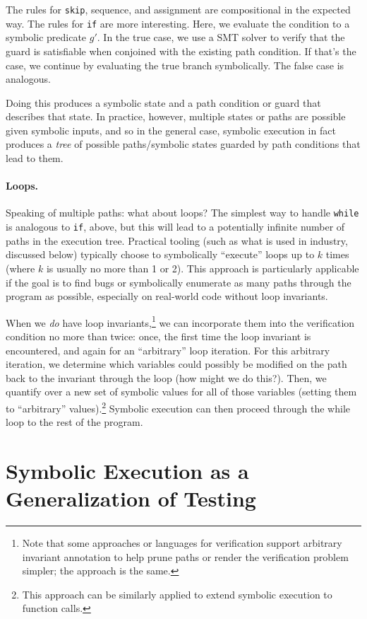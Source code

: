 \documentclass[11pt]{article}
\begin{document}
The rules for \texttt{skip}, sequence, and assignment are compositional in the expected
way. 
The rules for \texttt{if} are more interesting. Here, we evaluate the condition
to a symbolic predicate $g'$. In the true case, we use a SMT solver to verify
that the guard is satisfiable when conjoined with the existing path condition.
If that's the case, we continue by evaluating the true branch symbolically. The
false case is analogous.

Doing this produces a symbolic state and a path condition or guard that
describes that state.  In practice, however, multiple states or paths are
possible given symbolic inputs, and so in the general case, symbolic execution
in fact produces a \emph{tree} of possible paths/symbolic states guarded by path
conditions that lead to them. 

\paragraph{Loops.} 
Speaking of multiple paths: what about loops? The simplest way to handle
\texttt{while} is analogous to \texttt{if}, above, but this will lead to a
potentially infinite number of paths in the execution tree.  Practical tooling
(such as what is used in industry, discussed below) typically choose to
symbolically ``execute'' loops up to $k$ times (where $k$ is usually no more
than 1 or 2).  
%
This approach is particularly applicable if the goal is to find bugs or
symbolically enumerate as many paths through the program as possible, especially
on real-world code without loop invariants.

When we \emph{do} have loop invariants,\footnote{Note that some approaches or
  languages for verification support arbitrary invariant annotation to help
  prune paths or render the verification problem simpler; the approach is the
  same. } we can incorporate them into the verification condition no more than
twice: once, the first time the loop invariant is encountered, and again for an
``arbitrary'' loop iteration. For this arbitrary iteration, we determine which
variables could possibly be modified on the path back to the invariant through
the loop (how might we do this?). Then, we quantify over a new set of symbolic
values for all of those variables (setting them to ``arbitrary''
values).\footnote{This approach can be similarly applied to extend symbolic
  execution to function calls.} Symbolic execution can then proceed through the
while loop to the rest of the program.

\section{Symbolic Execution as a Generalization of Testing}
\end{document}
